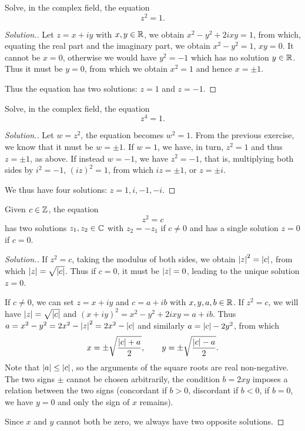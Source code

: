 \begin{exercise}
  \label{ex:radice_uno}
Solve, in the complex field, the equation 
\[
  z^2=1.
\]
\end{exercise}
\begin{proof}[Solution.]
Let $z=x+iy$ with $x,y\in {\mathbb R}$, we obtain 
$x^2-y^2 + 2 i xy = 1$, from which, equating the real part 
and the imaginary part, we obtain $x^2-y^2=1$, $xy=0$.
It cannot be $x=0$, otherwise we would have $y^2=-1$
which has no solution $y\in {\mathbb R}$.
Thus it must be $y=0$, from which we obtain $x^2=1$ and hence $x=\pm 1$.

Thus the equation has two solutions: $z=1$ and $z=-1$.
\end{proof}
\begin{exercise}
  \label{ex:radice_quarta_uno}
Solve, in the complex field, the equation
\[
  z^4 = 1.
\]
\end{exercise}
\begin{proof}[Solution.]
Let $w=z^2$, the equation becomes $w^2=1$.
From the previous exercise, we know that it must be 
$w=\pm 1$.
If $w=1$, we have, in turn, $z^2=1$ and thus $z=\pm 1$, as above.
If instead $w=-1$, we have $z^2=-1$, that is, 
multiplying both sides by $i^2=-1$,
$(iz)^2=1$, from which $iz=\pm 1$, or $z=\pm i$.

We thus have four solutions: $z=1,i,-1,-i$.
\end{proof}

\begin{exercise}
  \label{ex:radice_complessa}
Given $c\in {\mathbb Z}$, the equation
\[
z^2 = c
\]
has two solutions $z_1,z_2\in {\mathbb C}$ with $z_2=-z_1$ if $c\neq 0$ 
and has a single solution $z=0$ if $c=0$.
\end{exercise}
\begin{proof}[Solution.]
If $z^2=c$, taking the modulus of both sides, we obtain 
${\left|z\right|}^2={\left|c\right|}$, from which ${\left|z\right|}=\sqrt{{\left|c\right|}}$.
Thus if $c=0$, it must be ${\left|z\right|}=0$, leading to the unique
solution $z=0$.

If $c\neq 0$, we can set $z=x+iy$ and $c=a+ib$
with $x,y,a,b\in {\mathbb R}$.
If $z^2=c$, we will have ${\left|z\right|}=\sqrt{{\left|c\right|}}$
and $(x+iy)^2 = x^2 - y^2 + 2ixy = a + ib$. 
Thus $a=x^2-y^2 = 2x^2 - {\left|z\right|}^2 = 2x^2- {\left|c\right|}$ 
and similarly $a = {\left|c\right|}-2y^2$, from which 
\[
  x = \pm \sqrt{\frac{{\left|c\right|}+a}2}, \qquad
  y = \pm \sqrt{\frac{{\left|c\right|}-a}2}.
\]
Note that ${\left|a\right|}\le {\left|c\right|}$, so the arguments of the 
square roots are real non-negative.
The two signs $\pm$ cannot be chosen arbitrarily, 
the condition $b=2xy$ imposes a relation between the two signs
(concordant if $b>0$, discordant if $b<0$, if $b=0$, we have $y=0$ 
and only the sign of $x$ remains).

Since $x$ and $y$ cannot both be zero, we always have
two opposite solutions.
\end{proof}

